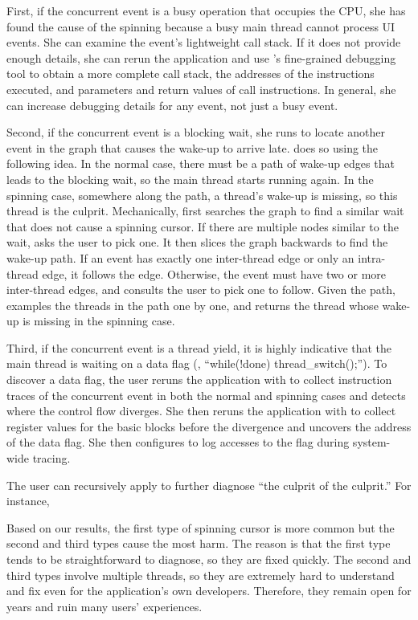 First, if the concurrent event is a busy operation that occupies the CPU,
she has found the cause of the spinning because a busy main thread cannot
process UI events.  She can examine the event's lightweight call stack.
If it does not provide enough details, she can rerun the application and
use \xxx's fine-grained debugging tool to obtain a more complete call
stack, the addresses of the instructions executed, and parameters and
return values of call instructions.  In general, she can increase
debugging details for any event, not just a busy event.

Second, if the concurrent event is a blocking wait, she runs \xxx to
locate another event in the graph that causes the wake-up to arrive
late. \xxx does so using the following idea.  In the normal case, there
must be a path of wake-up edges that leads to the blocking wait, so the
main thread starts running again.  In the spinning case, somewhere along
the path, a thread's wake-up is missing, so this thread is the culprit.
Mechanically, \xxx first searches the graph to find a similar wait that
does not cause a spinning cursor.  If there are multiple nodes similar to
the wait, \xxx asks the user to pick one.  It then slices the graph
backwards to find the wake-up path.  If an event has exactly one
inter-thread edge or only an intra-thread edge, it follows the edge.
Otherwise, the event must have two or more inter-thread edges, and \xxx
consults the user to pick one to follow.  Given the path, \xxx examples
the threads in the path one by one, and returns the thread whose wake-up
is missing in the spinning case.

Third, if the concurrent event is a thread yield, it is highly indicative
that the main thread is waiting on a data flag (\eg, ``while(!done)
thread\_switch();'').  To discover a data flag, the user reruns the
application with \xxx to collect instruction traces of the concurrent
event in both the normal and spinning cases and detects where the control
flow diverges.  She then reruns the application with \xxx to collect
register values for the basic blocks before the divergence and uncovers
the address of the data flag.  She then configures \xxx to log accesses to
the flag during system-wide tracing.

The user can recursively apply \xxx to further diagnose ``the culprit of
the culprit.''  For instance, 

Based on our results, the first type of spinning cursor is more common but
the second and third types cause the most harm.  The reason is that the
first type tends to be straightforward to diagnose, so they are fixed
quickly.  The second and third types involve multiple threads, so they are
extremely hard to understand and fix even for the application's own
developers.  Therefore, they remain open for years and ruin many users'
experiences.


